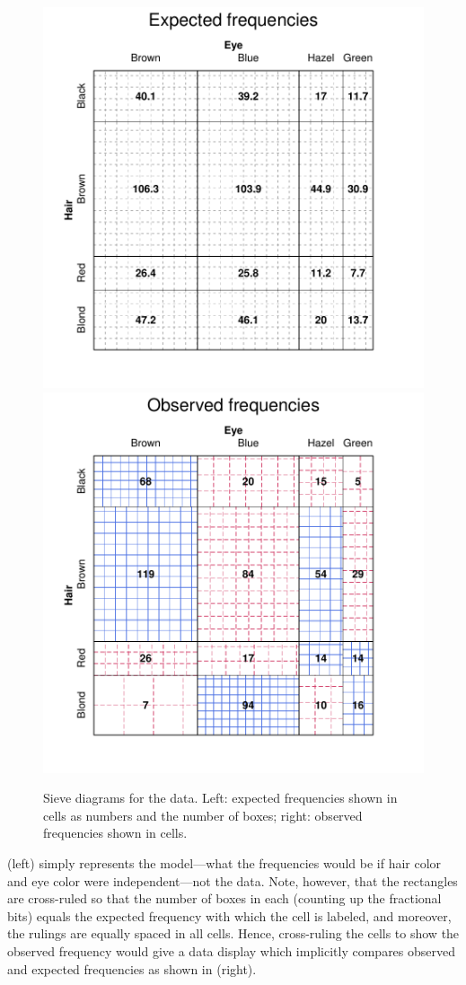 \documentclass[10pt,krantz2]{krantz}\usepackage[]{graphicx}\usepackage[]{color}
\newenvironment{knitrout}{}{} %
\renewenvironment{knitrout}{\small\renewcommand{\baselinestretch}{.85}}{} %
\begin{document}
\begin{knitrout}
\color{fgcolor}\begin{figure}[!htbp]

\centerline{\includegraphics[width=.49\textwidth]{ch04/fig/HE-sieve-1} 
\includegraphics[width=.49\textwidth]{ch04/fig/HE-sieve-2} }

\caption[Sieve diagrams for the  data]{Sieve diagrams for the  data. Left: expected frequencies shown in cells as numbers and the number of boxes; right: observed frequencies shown in cells.\label{fig:HE-sieve}}
\end{figure}


\end{knitrout}

 (left) simply represents the model---what the frequencies would
be if hair color and eye color were independent---not the data.
Note, however, that the rectangles are cross-ruled so that the number of
boxes in each (counting up the fractional bits) equals the expected
frequency with which the cell is labeled, and moreover, the
rulings are equally spaced in all cells.
Hence, cross-ruling the cells to show the observed frequency
would give a data display which implicitly compares observed
and expected frequencies as shown in  (right).
\end{document}
